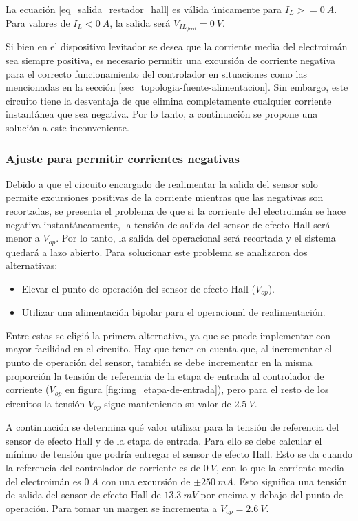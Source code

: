 La ecuación \ref{eq_salida_restador_hall} es válida únicamente para $I_L>=0\:A$. Para valores de $I_L<0\:A$, la salida será $V_{IL_{feed}}=0\:V$.

Si bien en el dispositivo levitador se desea que la corriente media del electroimán sea siempre positiva, es necesario permitir una excursión de corriente negativa para el correcto funcionamiento del controlador en situaciones como las mencionadas en la sección \ref{sec_topologia-fuente-alimentacion}. Sin embargo, este circuito tiene la desventaja de que elimina completamente cualquier corriente instantánea que sea negativa. Por lo tanto, a continuación se propone una solución a este inconveniente.




\subsubsection{Ajuste para permitir corrientes negativas} \label{sec:ajuste_corrientes_negativas}

Debido a que el circuito encargado de realimentar la salida del sensor solo permite excursiones positivas de la corriente mientras que las negativas son recortadas, se presenta el problema de que si la corriente del electroimán se hace negativa instantáneamente, la tensión de salida del sensor de efecto Hall será menor a $V_{op}$. Por lo tanto, la salida del operacional será recortada y el sistema quedará a lazo abierto. Para solucionar este problema se analizaron dos alternativas:

\begin{itemize} 
	\item Elevar el punto de operación del sensor de efecto Hall ($V_{op}$).
	
	\item Utilizar una alimentación bipolar para el operacional de realimentación.
\end{itemize}

Entre estas se eligió la primera alternativa, ya que se puede implementar con mayor facilidad en el circuito. Hay que tener en cuenta que, al incrementar el punto de operación del sensor, también se debe incrementar en la misma proporción la tensión de referencia de la etapa de entrada al controlador de corriente ($V_{op}$ en figura \ref{fig:img_etapa-de-entrada}), pero para el resto de los circuitos la tensión $V_{op}$ sigue manteniendo su valor de $2.5\:V$.

A continuación se determina qué valor utilizar para la tensión de referencia del sensor de efecto Hall y de la etapa de entrada. Para ello se debe calcular el mínimo de tensión que podría entregar el sensor de efecto Hall. Esto se da cuando la referencia del controlador de corriente es de $0\:V$, con lo que la corriente media del electroimán es $0 \:A$ con una excursión de $±250\:mA$. Esto significa una tensión de salida del sensor de efecto Hall de $13.3\:mV$ por encima y debajo del punto de operación. Para tomar un margen se incrementa a $V_{op}=2.6\:V$. 

